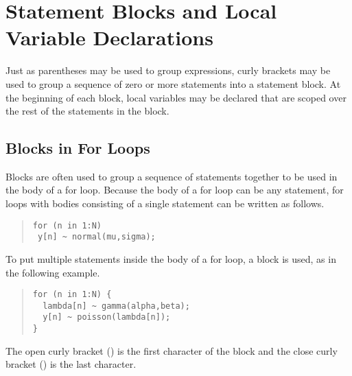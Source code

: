 %


\section{Statement Blocks and Local Variable Declarations}

Just as parentheses may be used to group expressions, curly brackets
may be used to group a sequence of zero or more statements into a
statement block.  At the beginning of each block, local variables may be
declared that are scoped over the rest of the statements in the block.

\subsection{Blocks in For Loops}

Blocks are often used to group a sequence of statements together to be
used in the body of a for loop.  Because the body of a for loop can be
any statement, for loops with bodies consisting of a single statement
can be written as follows.
%
\begin{quote}
\begin{Verbatim} 
for (n in 1:N) 
 y[n] ~ normal(mu,sigma);
\end{Verbatim}
\end{quote}
% 
To put multiple statements inside the body of a for loop, a block is
used, as in the following example.
%
\begin{quote}
\begin{Verbatim}
for (n in 1:N) {
  lambda[n] ~ gamma(alpha,beta);
  y[n] ~ poisson(lambda[n]);
}
\end{Verbatim}
\end{quote}
%
The open curly bracket (\code{\{}) is the first character of the block
and the close curly bracket (\code{\}}) is the last character.


